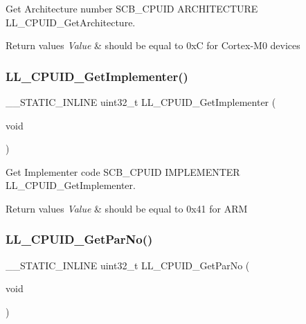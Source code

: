 Get Architecture number  S\+C\+B\+\_\+\+C\+P\+U\+ID A\+R\+C\+H\+I\+T\+E\+C\+T\+U\+RE L\+L\+\_\+\+C\+P\+U\+I\+D\+\_\+\+Get\+Architecture. 


\begin{DoxyRetVals}{Return values}
{\em Value} & should be equal to 0xC for Cortex-\/\+M0 devices \\
\hline
\end{DoxyRetVals}
\mbox{\label{group___c_o_r_t_e_x___l_l___e_f___m_c_u___i_n_f_o_ga648a5236b7fa08786086fcc4ce42b4b9}} 
\subsubsection{\texorpdfstring{L\+L\+\_\+\+C\+P\+U\+I\+D\+\_\+\+Get\+Implementer()}{LL\_CPUID\_GetImplementer()}}
{\footnotesize\ttfamily \+\_\+\+\_\+\+S\+T\+A\+T\+I\+C\+\_\+\+I\+N\+L\+I\+NE uint32\+\_\+t L\+L\+\_\+\+C\+P\+U\+I\+D\+\_\+\+Get\+Implementer (\begin{DoxyParamCaption}\item[{void}]{ }\end{DoxyParamCaption})}



Get Implementer code  S\+C\+B\+\_\+\+C\+P\+U\+ID I\+M\+P\+L\+E\+M\+E\+N\+T\+ER L\+L\+\_\+\+C\+P\+U\+I\+D\+\_\+\+Get\+Implementer. 


\begin{DoxyRetVals}{Return values}
{\em Value} & should be equal to 0x41 for A\+RM \\
\hline
\end{DoxyRetVals}
\mbox{\label{group___c_o_r_t_e_x___l_l___e_f___m_c_u___i_n_f_o_gac98fd56ad9162c3f372004bd07038bdb}} 
\subsubsection{\texorpdfstring{L\+L\+\_\+\+C\+P\+U\+I\+D\+\_\+\+Get\+Par\+No()}{LL\_CPUID\_GetParNo()}}
{\footnotesize\ttfamily \+\_\+\+\_\+\+S\+T\+A\+T\+I\+C\+\_\+\+I\+N\+L\+I\+NE uint32\+\_\+t L\+L\+\_\+\+C\+P\+U\+I\+D\+\_\+\+Get\+Par\+No (\begin{DoxyParamCaption}\item[{void}]{ }\end{DoxyParamCaption})}



